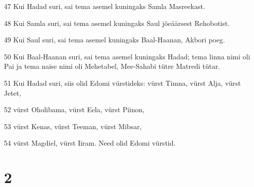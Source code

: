 \par 47 Kui Hadad suri, sai tema asemel kuningaks Samla Masreekast.
\par 48 Kui Samla suri, sai tema asemel kuningaks Saul jõeäärsest Rehobotist.
\par 49 Kui Saul suri, sai tema asemel kuningaks Baal-Haanan, Akbori poeg.
\par 50 Kui Baal-Haanan suri, sai tema asemel kuningaks Hadad; tema linna nimi oli Pai ja tema naise nimi oli Mehetabel, Mee-Sahabi tütre Matredi tütar.
\par 51 Kui Hadad suri, siis olid Edomi vürstideks: vürst Timna, vürst Alja, vürst Jetet,
\par 52 vürst Oholibama, vürst Eela, vürst Piinon,
\par 53 vürst Kenas, vürst Teeman, vürst Mibsar,
\par 54 vürst Magdiel, vürst Iiram. Need olid Edomi vürstid.

\chapter{2}

